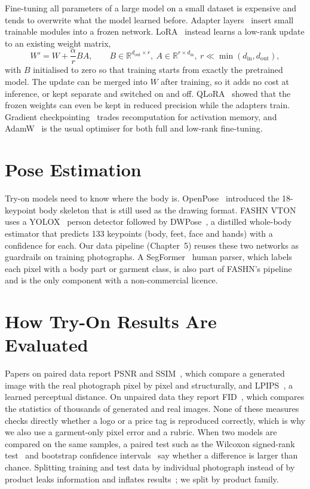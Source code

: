 Fine-tuning all parameters of a large model on a small dataset is expensive and tends to overwrite what the model learned before. Adapter layers~\cite{adapters} insert small trainable modules into a frozen network. LoRA~\cite{lora} instead learns a low-rank update to an existing weight matrix,
\begin{equation}
W' = W + \frac{\alpha}{r} BA, \qquad B \in \mathbb{R}^{d_\text{out}\times r},\ A \in \mathbb{R}^{r\times d_\text{in}},\ r \ll \min(d_\text{in}, d_\text{out}),
\end{equation}
with $B$ initialised to zero so that training starts from exactly the pretrained model. The update can be merged into $W$ after training, so it adds no cost at inference, or kept separate and switched on and off. QLoRA~\cite{qlora} showed that the frozen weights can even be kept in reduced precision while the adapters train. Gradient checkpointing~\cite{checkpoint} trades recomputation for activation memory, and AdamW~\cite{adamw} is the usual optimiser for both full and low-rank fine-tuning.

\section{Pose Estimation}

Try-on models need to know where the body is. OpenPose~\cite{openpose} introduced the 18-keypoint body skeleton that is still used as the drawing format. FASHN VTON uses a YOLOX~\cite{yolox} person detector followed by DWPose~\cite{dwpose}, a distilled whole-body estimator that predicts 133 keypoints (body, feet, face and hands) with a confidence for each. Our data pipeline (Chapter~5) reuses these two networks as guardrails on training photographs. A SegFormer~\cite{segformer} human parser, which labels each pixel with a body part or garment class, is also part of FASHN's pipeline and is the only component with a non-commercial licence.

\section{How Try-On Results Are Evaluated}

Papers on paired data report PSNR and SSIM~\cite{ssim}, which compare a generated image with the real photograph pixel by pixel and structurally, and LPIPS~\cite{lpips}, a learned perceptual distance. On unpaired data they report FID~\cite{fid}, which compares the statistics of thousands of generated and real images. None of these measures checks directly whether a logo or a price tag is reproduced correctly, which is why we also use a garment-only pixel error and a rubric. When two models are compared on the same samples, a paired test such as the Wilcoxon signed-rank test~\cite{wilcoxon} and bootstrap confidence intervals~\cite{bootstrap} say whether a difference is larger than chance. Splitting training and test data by individual photograph instead of by product leaks information and inflates results~\cite{leakage}; we split by product family.

